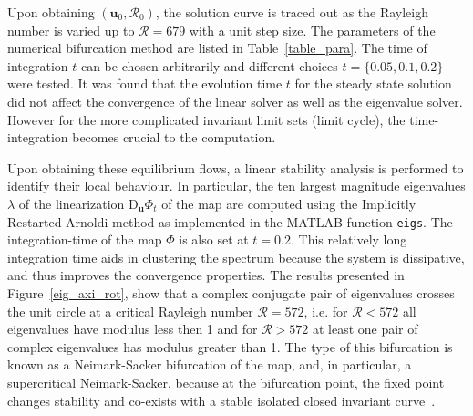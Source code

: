 Upon obtaining $(\mathbf{u}_0,\mathcal{R}_0)$, the solution curve is traced out as the Rayleigh number is varied up to $\mathcal{R} = 679$ with a unit step size. The parameters of the numerical bifurcation method are listed in Table~\ref{table_para}.
The time of integration $t$ can be chosen arbitrarily and different choices $t = \{0.05,0.1,0.2\}$ were tested. %
It was found that the evolution time $t$ for the steady state solution did not affect the convergence of the linear solver as well as the eigenvalue solver. However for the more complicated invariant limit sets (limit cycle), the time-integration becomes crucial to the computation.

Upon obtaining these equilibrium flows, a linear stability analysis is performed to identify their local behaviour. In particular, the ten largest magnitude eigenvalues $\lambda$ of the linearization $\mathrm{D}_{\mathbf{u}}\Phi_t$ of the map are computed using the Implicitly Restarted Arnoldi method as implemented in the MATLAB function \texttt{eigs}. The integration-time of the map $\Phi$ is also set at $t = 0.2$. This relatively long integration time aids in clustering the spectrum because the system is dissipative, and thus improves the convergence properties. The results presented in Figure~\ref{eig_axi_rot}, show that a complex conjugate pair of eigenvalues crosses  the unit circle at a critical Rayleigh number $\mathcal{R} = 572$, i.e. for $\mathcal{R} <572$ all eigenvalues have modulus less then 1 and for $\mathcal{R} > 572$ at least one pair of complex eigenvalues has modulus greater than 1. The type of this bifurcation is known as a {Neimark-Sacker} bifurcation of the map, and, in particular, a supercritical {Neimark-Sacker}, because at the bifurcation point, the fixed point changes stability and co-exists with a stable isolated closed invariant curve~\cite{Kuznet}.

